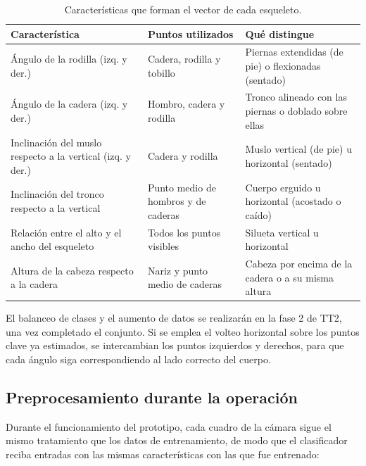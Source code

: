 \documentclass[12pt,a4paper,oneside]{book}
\theoremstyle{plain}
\theoremstyle{definition}
\theoremstyle{remark}
\begin{document}
\begin{table}[htbp]
\centering
\caption{Características que forman el vector de cada esqueleto.}
\label{tab:caracteristicas}
\small
\begin{tabular}{L{4.0cm}L{3.6cm}L{4.6cm}}
\toprule
\textbf{Característica} & \textbf{Puntos utilizados} & \textbf{Qué distingue} \\
\midrule
Ángulo de la rodilla (izq. y der.) & Cadera, rodilla y tobillo & Piernas extendidas (de pie) o flexionadas (sentado) \\
\addlinespace
Ángulo de la cadera (izq. y der.) & Hombro, cadera y rodilla & Tronco alineado con las piernas o doblado sobre ellas \\
\addlinespace
Inclinación del muslo respecto a la vertical (izq. y der.) & Cadera y rodilla & Muslo vertical (de pie) u horizontal (sentado) \\
\addlinespace
Inclinación del tronco respecto a la vertical & Punto medio de hombros y de caderas & Cuerpo erguido u horizontal (acostado o caído) \\
\addlinespace
Relación entre el alto y el ancho del esqueleto & Todos los puntos visibles & Silueta vertical u horizontal \\
\addlinespace
Altura de la cabeza respecto a la cadera & Nariz y punto medio de caderas & Cabeza por encima de la cadera o a su misma altura \\
\bottomrule
\end{tabular}
\end{table}

El balanceo de clases y el aumento de datos se realizarán en la fase 2 de TT2, una vez completado el conjunto. Si se emplea el volteo horizontal sobre los puntos clave ya estimados, se intercambian los puntos izquierdos y derechos, para que cada ángulo siga correspondiendo al lado correcto del cuerpo.
 
\subsection{Preprocesamiento durante la operación}
\label{sec:preproc-operacion}
 
Durante el funcionamiento del prototipo, cada cuadro de la cámara sigue el mismo tratamiento que los datos de entrenamiento, de modo que el clasificador reciba entradas con las mismas características con las que fue entrenado:
 
\end{document}
